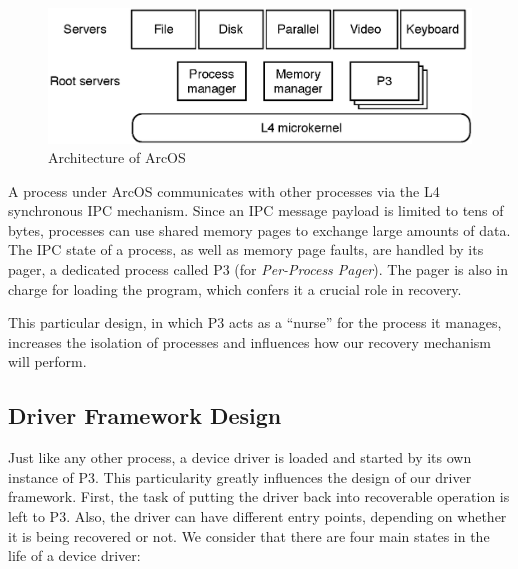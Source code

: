 \documentclass[times, 10pt, twocolumn]{article}
\begin{document}
\begin{figure}[ht]
\centering
\includegraphics[scale=0.45]{figures/architecture}
\caption{Architecture of ArcOS}
\label{fig:arc}
\end{figure}

A process under ArcOS communicates with other processes via the L4 synchronous IPC mechanism. Since an IPC message payload is limited to tens of bytes, processes can use shared memory pages to exchange large amounts of data. The IPC state of a process, as well as memory page faults, are handled by its pager, a dedicated process called P3 (for \emph{Per-Process Pager}). The pager is also in charge for loading the program, which confers it a crucial role in recovery.


This particular design, in which P3 acts as a ``nurse'' for the process it manages, increases the isolation of processes and influences how our recovery mechanism will perform.

\subsection{Driver Framework Design}
\label{sec:design-framework}
Just like any other process, a device driver is loaded and started by its own instance of P3. This particularity greatly influences the design of our driver framework. First, the task of putting the driver back into recoverable operation is left to P3. Also, the driver can have different entry points, depending on whether it is being recovered or not. We consider that there are four main states in the life of a device driver:
\end{document}
